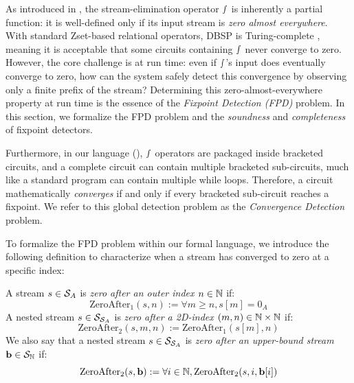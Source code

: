 As introduced in , the stream-elimination operator $\smallint$ is inherently a partial function: it is well-defined only if its input stream is \emph{zero almost everywhere}.
With standard Zset-based relational operators, DBSP is Turing-complete \cite{budiu2025dbsp}, meaning it is acceptable that some circuits containing $\smallint$ never converge to zero.
However, the core challenge is at run time: even if $\smallint$'s input does eventually converge to zero, how can the system safely detect this convergence by observing only a finite prefix of the stream? Determining this zero-almost-everywhere property at run time is the essence of the \emph{Fixpoint Detection (FPD)} problem. In this section, we formalize the FPD problem and the \emph{soundness} and \emph{completeness} of fixpoint detectors.

Furthermore, in our language (), $\smallint$ operators are packaged inside bracketed circuits, and a complete circuit can contain multiple bracketed sub-circuits, much like a standard program can contain multiple while loops. Therefore, a circuit mathematically \emph{converges} if and only if every bracketed sub-circuit reaches a fixpoint. We refer to this global detection problem as the \emph{Convergence Detection} problem.

To formalize the FPD problem within our formal language, we introduce the following definition to
characterize when
a stream has converged to zero at a specific index:
\begin{definition}[ZeroAfter]\label{De:ZeroAfter}
    A stream $s \in \mathcal{S}_{A}$ is \emph{zero after an outer index $n \in \mathbb{N}$} if:
    \[\text{ZeroAfter}_1(s, n) := \forall m \ge n, s[m] = 0_A\]
    A nested stream $s \in \mathcal{S}_{\mathcal{S}_{A}}$ is \emph{zero after a 2D-index $(m, n) \in \mathbb{N} \times \mathbb{N}$} if:
    \[\text{ZeroAfter}_2(s, m, n) := \text{ZeroAfter}_1(s[m], n)\]
    We also say that a nested stream $s \in \mathcal{S}_{\mathcal{S}_{A}}$ is \emph{zero after an upper-bound stream $\mathbf{b} \in \mathcal{S}_{\mathbb{N}}$} if:
    \[\text{ZeroAfter}_2(s, \mathbf{b}) := \forall i \in \mathbb{N}, \text{ZeroAfter}_2(s, i, \mathbf{b}[i])\]
\end{definition}

